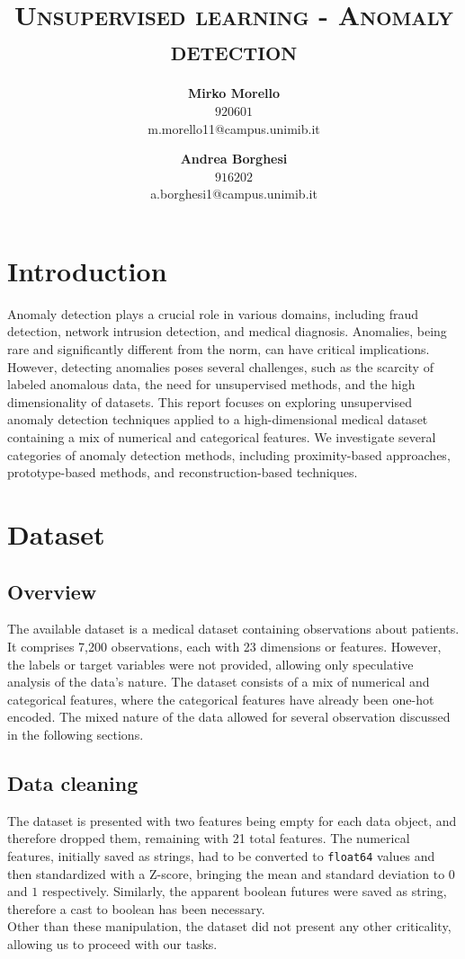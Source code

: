 \documentclass[9pt,twocolumn]{article}
\title{\textbf{\textsc{Unsupervised learning - Anomaly detection}}}
\author{
  \textbf{Mirko Morello} \\
  $920601$ \\
  m.morello11@campus.unimib.it \\
  \and
  \textbf{Andrea Borghesi} \\
    $916202$ \\
  a.borghesi1@campus.unimib.it
}
\begin{document}
\twocolumn[
  \begin{@twocolumnfalse}
    \maketitle
  \end{@twocolumnfalse}
]

\section{Introduction}

Anomaly detection plays a crucial role in various domains, including fraud detection, network intrusion detection, and medical diagnosis. Anomalies, being rare and significantly different from the norm, can have critical implications. However, detecting anomalies poses several challenges, such as the scarcity of labeled anomalous data, the need for unsupervised methods, and the high dimensionality of datasets.
This report focuses on exploring unsupervised anomaly detection techniques applied to a high-dimensional medical dataset containing a mix of numerical and categorical features. We investigate several categories of anomaly detection methods, including proximity-based approaches, prototype-based methods, and reconstruction-based techniques.

\section{Dataset}
\subsection{Overview}
The available dataset is a medical dataset containing observations about patients. It comprises 7,200 observations, each with 23 dimensions or features. However, the labels or target variables were not provided, allowing only speculative analysis of the data's nature. The dataset consists of a mix of numerical and categorical features, where the categorical features have already been one-hot encoded.
The mixed nature of the data allowed for several observation discussed in the following sections.
\subsection{Data cleaning}
The dataset is presented with two features being empty for each data object, and therefore dropped them, remaining with 21 total features. The numerical features, initially saved as strings, had to be converted to \texttt{float64} values and then standardized with a Z-score, bringing the mean and standard deviation to $0$ and $1$ respectively.
Similarly, the apparent boolean futures were saved as string, therefore a cast to boolean has been necessary.\\
Other than these manipulation, the dataset did not present any other criticality, allowing us to proceed with our tasks.
\end{document}
